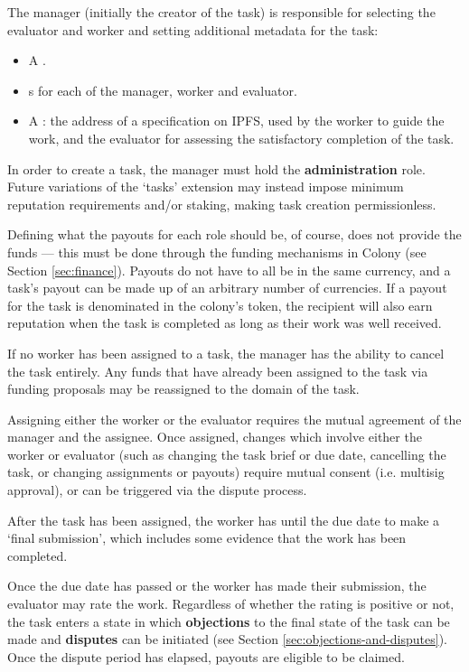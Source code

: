 The manager (initially the creator of the task) is responsible for selecting the evaluator and worker and setting additional metadata for the task:

\begin{itemize}
\item A .
\item {}s for each of the manager, worker and evaluator.
\item A : the address of a specification on IPFS, used by the worker to guide the work, and the evaluator for assessing the satisfactory completion of the task.
\end{itemize}

In order to create a task, the manager must hold the \textbf{administration} role. Future variations of the `tasks' extension may instead impose minimum reputation requirements and/or staking, making task creation permissionless.

Defining what the payouts for each role should be, of course, does not provide the funds --- this must be done through the funding mechanisms in Colony (see Section \ref{sec:finance}). Payouts do not have to all be in the same currency, and a task's payout can be made up of an arbitrary number of currencies. If a payout for the task is denominated in the colony's token, the recipient will also earn reputation when the task is completed as long as their work was well received.

If no worker has been assigned to a task, the manager has the ability to cancel the task entirely. Any funds that have already been assigned to the task via funding proposals may be reassigned to the domain of the task.

Assigning either the worker or the evaluator requires the mutual agreement of the manager and the assignee. Once assigned, changes which involve either the worker or evaluator (such as changing the task brief or due date, cancelling the task, or changing assignments or payouts) require mutual consent (i.e. multisig approval), or can be triggered via the dispute process.

After the task has been assigned, the worker has until the due date to make a `final submission', which includes some evidence that the work has been completed.

Once the due date has passed or the worker has made their submission, the evaluator may rate the work. Regardless of whether the rating is positive or not, the task enters a state in which \textbf{objections} to the final state of the task can be made and \textbf{disputes} can be initiated (see Section \ref{sec:objections-and-disputes}). Once the dispute period has elapsed, payouts are eligible to be claimed. \\

